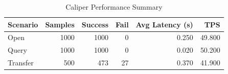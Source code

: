 \begin{table}
\caption{Caliper Performance Summary}
\label{tab:caliper_round}
\begin{tabular}{lrrrrr}
\toprule
Scenario & Samples & Success & Fail & Avg Latency (s) & TPS \\
\midrule
Open & 1000 & 1000 & 0 & 0.250 & 49.800 \\
Query & 1000 & 1000 & 0 & 0.020 & 50.200 \\
Transfer & 500 & 473 & 27 & 0.370 & 41.900 \\
\bottomrule
\end{tabular}
\end{table}
